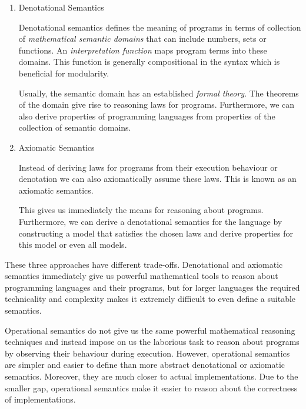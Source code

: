 {\begin{enumerate}
  Operational semantics defines the meaning of programs by specifying their
  execution in a state transition system. A \emph{state transition function} or
  a \emph{state transition relation} on the terms of the programming language
  defines the possible execution steps. The program is part of the state. For
  small languages the entire state might consist of only the program. After
  taking a step we are left with an updated state that includes a residual
  program.


\item Denotational Semantics

  Denotational semantics defines the meaning of programs in terms of collection
  of \emph{mathematical semantic domains} that can include numbers, sets or
  functions. An \emph{interpretation function} maps program terms into these
  domains. This function is generally compositional in the syntax which is
  beneficial for modularity.

  Usually, the semantic domain has an established \emph{formal theory}. The
  theorems of the domain give rise to reasoning laws for programs. Furthermore,
  we can also derive properties of programming languages from properties of the
  collection of semantic domains.

\item Axiomatic Semantics

  Instead of deriving laws for programs from their execution behaviour or
  denotation we can also axiomatically assume these laws. This is known as an
  axiomatic semantics.

  This gives us immediately the means for reasoning about programs. Furthermore,
  we can derive a denotational semantics for the language by constructing a
  model that satisfies the chosen laws and derive properties for this model or
  even all models.

\end{enumerate}

These three approaches have different trade-offs. Denotational and axiomatic
semantics immediately give us powerful mathematical tools to reason about
programming languages and their programs, but for larger languages the required
technicality and complexity makes it extremely difficult to even define a
suitable semantics.

Operational semantics do not give us the same powerful mathematical reasoning
techniques and instead impose on us the laborious task to reason about programs
by observing their behaviour during execution. However, operational semantics
are simpler and easier to define than more abstract denotational or axiomatic
semantics. Moreover, they are much closer to actual implementations. Due to the
smaller gap, operational semantics make it easier to reason about the
correctness of implementations.

}
